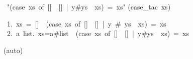 \begin{isabelle}%
\isanewline
{}~{"}(case~xs~of~[]~{\isasymRightarrow}~[]~|~y\#ys~{\isasymRightarrow}~xs)~=~xs{"}\isanewline
{}(case\_tac~xs)%
\begin{isamarkuptxt}%
\begin{isabellepar}%
~1.~xs~=~[]~{\isasymLongrightarrow}~(case~xs~of~[]~{\isasymRightarrow}~[]~|~y~\#~ys~{\isasymRightarrow}~xs)~=~xs\isanewline
~2.~{\isasymAnd}a~list.~xs=a\#list~{\isasymLongrightarrow}~(case~xs~of~[]~{\isasymRightarrow}~[]~|~y\#ys~{\isasymRightarrow}~xs)~=~xs%
\end{isabellepar}%
\end{isamarkuptxt}%
(auto)\isanewline
\end{isabelle}%
